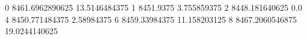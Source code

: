 0 8461.6962890625 13.5146484375
1 8451.9375 3.755859375
2 8448.181640625 0.0
4 8450.771484375 2.58984375
6 8459.33984375 11.158203125
8 8467.2060546875 19.0244140625
